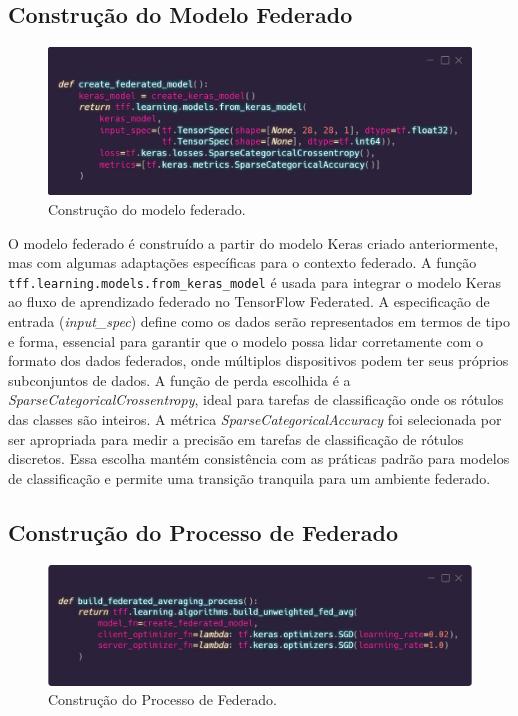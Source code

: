 \subsection{Construção do Modelo Federado}

\begin{figure}[ht]
    \centering
    \includegraphics[scale=0.25]{figuras/desenvolvimento/federatedModel.eps}
    \caption{Construção do modelo federado.}
    \label{fig:federatedModel}
\end{figure}

O modelo federado é construído a partir do modelo Keras criado anteriormente, mas com algumas adaptações específicas para o contexto federado. A função \texttt{tff.learning.models.from\_keras\_model} é usada para integrar o modelo Keras ao fluxo de aprendizado federado no TensorFlow Federated. A especificação de entrada (\textit{input\_spec}) define como os dados serão representados em termos de tipo e forma, essencial para garantir que o modelo possa lidar corretamente com o formato dos dados federados, onde múltiplos dispositivos podem ter seus próprios subconjuntos de dados. A função de perda escolhida é a \textit{SparseCategoricalCrossentropy}, ideal para tarefas de classificação onde os rótulos das classes são inteiros. A métrica \textit{SparseCategoricalAccuracy} foi selecionada por ser apropriada para medir a precisão em tarefas de classificação de rótulos discretos. Essa escolha mantém consistência com as práticas padrão para modelos de classificação e permite uma transição tranquila para um ambiente federado.

\subsection{Construção do Processo de Federado}

\begin{figure}[ht]
    \centering
    \includegraphics[scale=0.25]{figuras/desenvolvimento/federatedProccess.eps}
    \caption{Construção do Processo de Federado.}
    \label{fig:federatedProccess}
\end{figure}

